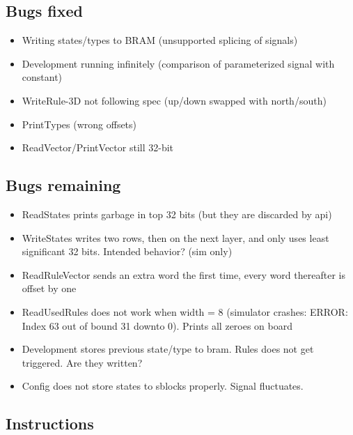 \subsection{Bugs fixed}

\begin{itemize}
    \item Writing states/types to BRAM (unsupported splicing of signals)
    \item Development running infinitely (comparison of parameterized signal with constant)
    \item WriteRule-3D not following spec (up/down swapped with north/south)
    \item PrintTypes (wrong offsets)
    \item ReadVector/PrintVector still 32-bit
\end{itemize}

\subsection{Bugs remaining}

\begin{itemize}
    \item ReadStates prints garbage in top 32 bits (but they are discarded by api)
    \item WriteStates writes two rows, then on the next layer, and only uses least significant 32 bits. Intended behavior? (sim only)
    \item ReadRuleVector sends an extra word the first time, every word thereafter is offset by one
    \item ReadUsedRules does not work when width = 8 (simulator crashes: ERROR: Index 63 out of bound 31 downto 0). Prints all zeroes on board
    \item Development stores previous state/type to bram. Rules does not get triggered. Are they written?
    \item Config does not store states to sblocks properly. Signal fluctuates.
\end{itemize}

\subsection{Instructions}

